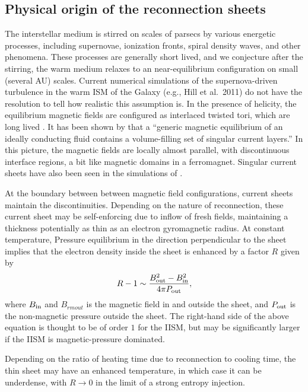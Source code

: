 \documentclass[useAMS,usenatbib]{mn2e}
\begin{document}


\subsection{Physical origin of the reconnection sheets}

The interstellar medium is stirred on scales of parsecs by various
energetic processes, including supernovae, ionization fronts, spiral
density waves, and other phenomena.  These processes are generally
short lived, and we conjecture after the stirring, the warm medium
relaxes to an near-equilibrium configuration on small (several AU)
scales. Current numerical simulations of the supernova-driven
turbulence in the warm ISM of the Galaxy (e.g., Hill et al.~2011) do
not have the resolution to tell how realistic this assumption is.  In
the presence of helicity, the equilibrium magnetic fields are
configured as interlaced twisted tori, which are long lived
\citep{2004Natur.431..819B}.  It has been shown by \citep{2009arXiv0909.1815G}
that a ``generic magnetic equilibrium of an ideally conducting fluid
contains a volume-filling set of singular current layers.'' In this
picture, the magnetic fields are locally almost parallel, with
discontinuous interface regions, a bit like magnetic domains in a
ferromagnet. Singular current sheets have also been seen in the
simulations of \citet{2004PhRvL..92h4504S}.

At the boundary between between magnetic field configurations, current
sheets maintain the discontinuities.  Depending on the nature of
reconnection, these current sheet may be self-enforcing due to inflow
of fresh fields, maintaining a thickness potentially as thin as an
electron gyromagnetic radius.  At constant temperature,
Pressure equilibrium in the direction
perpendicular to the sheet implies that the electron density inside the sheet is
enhanced by a factor $R$ given by
\begin{equation} 
R-1\sim {B_{\rm out}^2-B_{\rm in}^2\over 4\pi P_{\rm out}},
\label{ratio}
\end{equation}
  where $B_{\rm in}$ and $B_{rm out}$ is the magnetic field in and outside the sheet,
  and $P_{\rm out}$ is the non-magnetic pressure outside the sheet. The right-hand side of
  the above equation is thought to be of order $1$ for the IISM, but may be significantly
  larger if the IISM is magnetic-pressure dominated. 

Depending on the ratio of heating time due to reconnection to cooling
time, the thin sheet may have an enhanced temperature, in which case
it can be underdense, with $R \rightarrow 0$ in the limit of a
strong entropy injection.
\end{document}
